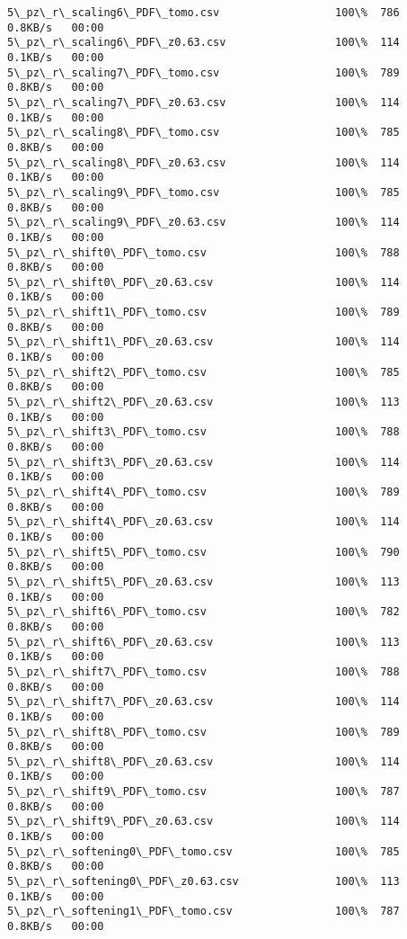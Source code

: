 \documentclass[11pt]{article}
\begin{document}
\begin{Verbatim}[commandchars=\\\{\}]
5\_pz\_r\_scaling6\_PDF\_tomo.csv                  100\%  786     0.8KB/s   00:00    
5\_pz\_r\_scaling6\_PDF\_z0.63.csv                 100\%  114     0.1KB/s   00:00    
5\_pz\_r\_scaling7\_PDF\_tomo.csv                  100\%  789     0.8KB/s   00:00    
5\_pz\_r\_scaling7\_PDF\_z0.63.csv                 100\%  114     0.1KB/s   00:00    
5\_pz\_r\_scaling8\_PDF\_tomo.csv                  100\%  785     0.8KB/s   00:00    
5\_pz\_r\_scaling8\_PDF\_z0.63.csv                 100\%  114     0.1KB/s   00:00    
5\_pz\_r\_scaling9\_PDF\_tomo.csv                  100\%  785     0.8KB/s   00:00    
5\_pz\_r\_scaling9\_PDF\_z0.63.csv                 100\%  114     0.1KB/s   00:00    
5\_pz\_r\_shift0\_PDF\_tomo.csv                    100\%  788     0.8KB/s   00:00    
5\_pz\_r\_shift0\_PDF\_z0.63.csv                   100\%  114     0.1KB/s   00:00    
5\_pz\_r\_shift1\_PDF\_tomo.csv                    100\%  789     0.8KB/s   00:00    
5\_pz\_r\_shift1\_PDF\_z0.63.csv                   100\%  114     0.1KB/s   00:00    
5\_pz\_r\_shift2\_PDF\_tomo.csv                    100\%  785     0.8KB/s   00:00    
5\_pz\_r\_shift2\_PDF\_z0.63.csv                   100\%  113     0.1KB/s   00:00    
5\_pz\_r\_shift3\_PDF\_tomo.csv                    100\%  788     0.8KB/s   00:00    
5\_pz\_r\_shift3\_PDF\_z0.63.csv                   100\%  114     0.1KB/s   00:00    
5\_pz\_r\_shift4\_PDF\_tomo.csv                    100\%  789     0.8KB/s   00:00    
5\_pz\_r\_shift4\_PDF\_z0.63.csv                   100\%  114     0.1KB/s   00:00    
5\_pz\_r\_shift5\_PDF\_tomo.csv                    100\%  790     0.8KB/s   00:00    
5\_pz\_r\_shift5\_PDF\_z0.63.csv                   100\%  113     0.1KB/s   00:00    
5\_pz\_r\_shift6\_PDF\_tomo.csv                    100\%  782     0.8KB/s   00:00    
5\_pz\_r\_shift6\_PDF\_z0.63.csv                   100\%  113     0.1KB/s   00:00    
5\_pz\_r\_shift7\_PDF\_tomo.csv                    100\%  788     0.8KB/s   00:00    
5\_pz\_r\_shift7\_PDF\_z0.63.csv                   100\%  114     0.1KB/s   00:00    
5\_pz\_r\_shift8\_PDF\_tomo.csv                    100\%  789     0.8KB/s   00:00    
5\_pz\_r\_shift8\_PDF\_z0.63.csv                   100\%  114     0.1KB/s   00:00    
5\_pz\_r\_shift9\_PDF\_tomo.csv                    100\%  787     0.8KB/s   00:00    
5\_pz\_r\_shift9\_PDF\_z0.63.csv                   100\%  114     0.1KB/s   00:00    
5\_pz\_r\_softening0\_PDF\_tomo.csv                100\%  785     0.8KB/s   00:00    
5\_pz\_r\_softening0\_PDF\_z0.63.csv               100\%  113     0.1KB/s   00:00    
5\_pz\_r\_softening1\_PDF\_tomo.csv                100\%  787     0.8KB/s   00:00    

\end{Verbatim}
\end{document}
